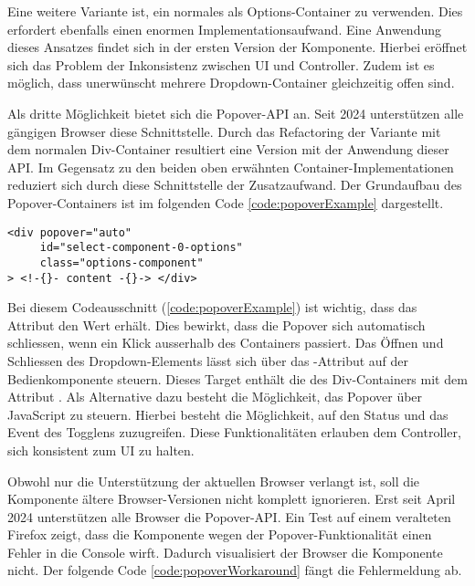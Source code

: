 Eine weitere Variante ist, ein normales  als Options-Container zu verwenden. 
Dies erfordert ebenfalls einen enormen Implementationsaufwand. 
Eine Anwendung dieses Ansatzes findet sich in der ersten Version der Komponente. 
Hierbei eröffnet sich das Problem der Inkonsistenz zwischen UI und Controller. 
Zudem ist es möglich, dass unerwünscht mehrere Dropdown-Container gleichzeitig offen sind. 

Als dritte Möglichkeit bietet sich die Popover-API an. 
Seit 2024 unterstützen alle gängigen Browser diese Schnittstelle. 
Durch das Refactoring der Variante mit dem normalen Div-Container resultiert eine Version mit der Anwendung dieser API. 
Im Gegensatz zu den beiden oben erwähnten Container-Implementationen reduziert sich durch diese Schnittstelle der Zusatzaufwand. 
Der Grundaufbau des Popover-Containers ist im folgenden Code \ref{code:popoverExample} dargestellt. 

\begin{lstlisting}[style = htmlcssjs, caption = Beispiel – Popover-Container, label = code:popoverExample]
<div popover="auto"
     id="select-component-0-options" 
     class="options-component" 
> <!-{}- content -{}-> </div>
\end{lstlisting}

Bei diesem Codeausschnitt (\ref{code:popoverExample}) ist wichtig, dass das Attribut  den Wert  erhält. 
Dies bewirkt, dass die Popover sich automatisch schliessen, wenn ein Klick ausserhalb des Containers passiert. 
Das Öffnen und Schliessen des Dropdown-Elements lässt sich über das -Attribut auf der Bedienkomponente steuern. 
Dieses Target enthält die  des Div-Containers mit dem Attribut . 
Als Alternative dazu besteht die Möglichkeit, das Popover über JavaScript zu steuern. 
Hierbei besteht die Möglichkeit, auf den Status und das Event des Togglens zuzugreifen. 
Diese Funktionalitäten erlauben dem Controller, sich konsistent zum UI zu halten. 

Obwohl nur die Unterstützung der aktuellen Browser verlangt ist, soll die Komponente ältere Browser-Versionen nicht komplett ignorieren. 
Erst seit April 2024 unterstützen alle Browser die Popover-API. 
Ein Test auf einem veralteten Firefox zeigt, dass die Komponente wegen der Popover-Funktionalität einen Fehler in die Console wirft.
Dadurch visualisiert der Browser die Komponente nicht. 
Der folgende Code \ref{code:popoverWorkaround} fängt die Fehlermeldung ab. 

